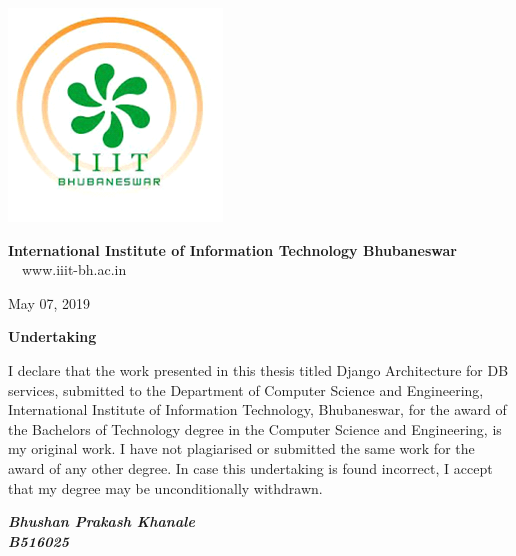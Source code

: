 \thispagestyle{empty}
\begin{minipage}{.1\linewidth}
\hspace*{-1.8cm}
\vspace*{-1.8cm}
\includegraphics[scale=0.65]{ch0/IIITlogo.png}

\end{minipage}
\hspace{.2cm}
\begin{minipage}{.9\linewidth}
{\Large
\textbf{International Institute of Information Technology Bhubaneswar\\}}
{\large
{}}
\textmd{$\quad$www.iiit-bh.ac.in}
\end{minipage}

\vspace{.35in}
%
\fontsize{12}{14}
\selectfont
\begin{flushright}
May 07, 2019
\end{flushright}
\vspace{1.0in}

\centerline{\Large{\bf Undertaking}}
\vspace{1cm}
\noindent
I declare that the work presented in this thesis titled
Django Architecture for DB services, submitted to the Department of
Computer Science and Engineering, International Institute of Information
Technology, Bhubaneswar, for the award of the Bachelors of Technology degree
in the Computer Science and Engineering, is my original work. I have not
plagiarised or submitted the same work for the award of any other degree.
In case this undertaking is found incorrect, I accept that my degree may be
unconditionally withdrawn.
\vspace*{0.5in}

\begin{flushright}
\textbf{\textit{Bhushan Prakash Khanale}} \\
\textbf{\textit{B516025}}
\end{flushright}
